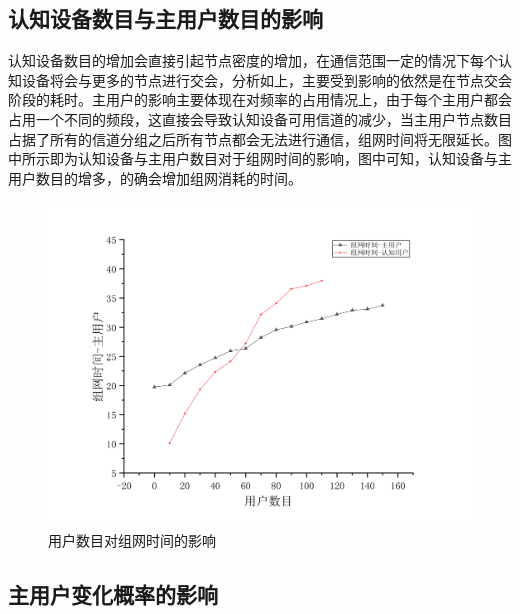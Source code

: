 \documentclass[a4paper,AutoFakeBold,oneside,12pt]{book}
\begin{document}
  \subsection{认知设备数目与主用户数目的影响}
  认知设备数目的增加会直接引起节点密度的增加，在通信范围一定的情况下每个认知设备将会与更多的节点进行交会，分析如上，主要受到影响的依然是在节点交会阶段的耗时。主用户的影响主要体现在对频率的占用情况上，由于每个主用户都会占用一个不同的频段，这直接会导致认知设备可用信道的减少，当主用户节点数目占据了所有的信道分组之后所有节点都会无法进行通信，组网时间将无限延长。图中所示即为认知设备与主用户数目对于组网时间的影响，图中可知，认知设备与主用户数目的增多，的确会增加组网消耗的时间。
  \begin{figure}[htbp]
\centering %
\includegraphics[scale=0.3]{pictures/PU-times.png} 
\caption{用户数目对组网时间的影响 } %
\label{PUANDSU}
\end{figure}
  
  \subsection{主用户变化概率的影响}
  
\end{document}
